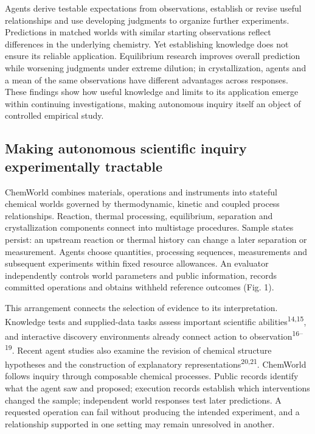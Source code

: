 \documentclass[12pt,a4paper]{article}
\begin{document}
Agents derive testable expectations from observations, establish or revise useful relationships and use developing judgments to organize further experiments. Predictions in matched worlds with similar starting observations reflect differences in the underlying chemistry. Yet establishing knowledge does not ensure its reliable application. Equilibrium research improves overall prediction while worsening judgments under extreme dilution; in crystallization, agents and a mean of the same observations have different advantages across responses. These findings show how useful knowledge and limits to its application emerge within continuing investigations, making autonomous inquiry itself an object of controlled empirical study.

\subsection{Making autonomous scientific inquiry experimentally tractable}\label{making-autonomous-scientific-inquiry-experimentally-tractable}

ChemWorld combines materials, operations and instruments into stateful chemical worlds governed by thermodynamic, kinetic and coupled process relationships. Reaction, thermal processing, equilibrium, separation and crystallization components connect into multistage procedures. Sample states persist: an upstream reaction or thermal history can change a later separation or measurement. Agents choose quantities, processing sequences, measurements and subsequent experiments within fixed resource allowances. An evaluator independently controls world parameters and public information, records committed operations and obtains withheld reference outcomes (Fig. 1).

This arrangement connects the selection of evidence to its interpretation. Knowledge tests and supplied-data tasks assess important scientific abilities\textsuperscript{14,15}, and interactive discovery environments already connect action to observation\textsuperscript{16--19}. Recent agent studies also examine the revision of chemical structure hypotheses and the construction of explanatory representations\textsuperscript{20,21}. ChemWorld follows inquiry through composable chemical processes. Public records identify what the agent saw and proposed; execution records establish which interventions changed the sample; independent world responses test later predictions. A requested operation can fail without producing the intended experiment, and a relationship supported in one setting may remain unresolved in another.
\end{document}
